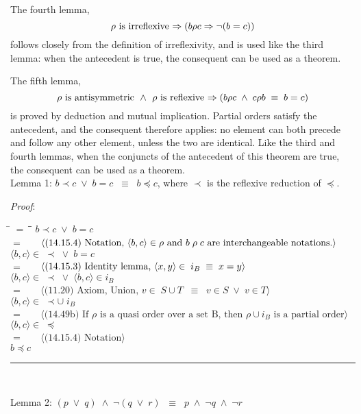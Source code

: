 \documentclass[12pt, fleqn, leqno]{article}
\newcommand{\lgap}{2pt}                             %
\newcommand{\mymathindent}{24pt}                    %
\newcommand{\equivs}{\ensuremath{\;\equiv\;}}       %
\newcommand{\equivss}{\ensuremath{\;\;\equiv\;\;}}  %
\newcommand{\lors}{\ensuremath{\;\lor\;}}           %
\newcommand{\lands}{\ensuremath{\;\land\;}}         %
\newcommand{\impl}{\ensuremath{\Rightarrow}}        %
\newcommand{\myqed}{\rule[-.23ex]{1.2ex}{2.0ex}}
\newcommand{\myqedtab}{\hspace{384pt}}              %
\newcommand{\Gll} {\langle}                         %
\newcommand{\Ggg} {\rangle}                         %
\newcommand{\Hint}[1]     {\ \ \ $\Gll              \mbox{#1} \Ggg$ }   %
\begin{document}
The fourth lemma,
\[\rho$ is irreflexive $\impl (b \rho c \impl \lnot (b = c))
\]
follows closely from the definition of irreflexivity, and is used like the third lemma: when the antecedent is true, the consequent can be used as a theorem.

The fifth lemma,
\[
\rho$ is antisymmetric $\lands$ $\rho$ is reflexive $\impl (b \rho c \lands c \rho b \equivs b = c)
\]
is proved by deduction and mutual implication.
Partial orders satisfy the antecedent, and the consequent therefore applies: no element can both precede and follow any other element, unless the two are identical.
Like the third and fourth lemmas, when the conjuncts of the antecedent of this theorem are true, the consequent can be used as a theorem.\\

Lemma 1: $b \prec c \lors b = c \equivss b \preceq c$, where $\prec$ is the reflexive reduction of $\preceq$.

\textit{Proof}:
\begin{tabbing}
\hspace{\mymathindent} \= $= \;$ \= \myqedtab \= \kill
	\> \>  $b \prec c \lors b = c$\\
	\> $=$  \>  \Hint{(14.15.4) Notation, $ \langle b, c \rangle \in \rho$ and $b \; \rho \; c$ are interchangeable notations.}\\[\lgap]
	\> \>   $ \langle b, c \rangle \in\; \prec \lors b = c$\\
	\> $=$  \>  \Hint{(14.15.3) Identity lemma, $ \langle x, y \rangle \in\; i_B \equivs x = y$}\\[\lgap]
	\> \>   $ \langle b, c \rangle \in\; \prec \lors \langle b, c \rangle \in i_B$\\
	\> $=$  \>  \Hint{(11.20) Axiom, Union, $v \in\; S \cup T \equivss v \in S \lors v \in T$}\\[\lgap]
	\> \>   $ \langle b, c \rangle \in\; \prec \cup\; i_B$\\
	\> $=$  \>  \Hint{(14.49b) If $\rho$ is a quasi order over a set B, then $\rho \cup i_B$ is a partial order}\\[\lgap]
	\> \>   $ \langle b, c \rangle \in\; \preceq$\\
	\> $=$  \>  \Hint{(14.15.4) Notation}\\[\lgap]
	\> \>   $b \preceq c$\quad \myqed\\
\end{tabbing}

Lemma 2: $(p \lors q) \lands \lnot (q \lors r) \equivss p \lands \lnot q \lands \lnot r$
\end{document}
